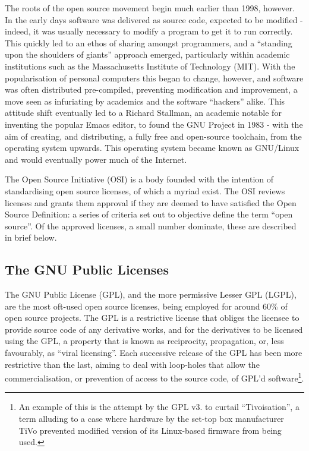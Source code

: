 \documentclass[a4paper]{article}
\begin{document}
The roots of the open source movement begin much earlier than 1998, however. In the early days software was delivered as source code, expected to be modified - indeed, it was usually necessary to modify a program to get it to run correctly\cite{historyos}. This quickly led to an ethos of sharing amongst programmers, and a “standing upon the shoulders of giants” approach emerged, particularly within academic institutions such as the Massachusetts Institute of Technology (MIT)\cite{faif}. With the popularisation of personal computers this began to change, however, and software was often distributed pre-compiled, preventing modification and improvement, a move seen as infuriating by academics and the software “hackers” alike. This attitude shift eventually led to a Richard Stallman, an academic notable for inventing the popular Emacs editor, to found the GNU Project in 1983 - with the aim of creating, and distributing, a fully free and open-source toolchain, from the operating system upwards\cite{stallmanusenet}. This operating system became known as GNU/Linux and would eventually power much of the Internet.

The Open Source Initiative\cite{osi} (OSI) is a body founded with the intention of standardising open source licenses, of which a myriad exist. The OSI reviews licenses and grants them approval if they are deemed to have satisfied the Open Source Definition: a series of criteria set out to objective define the term “open source”\cite{osireview}. Of the approved licenses, a small number dominate, these are described in brief below.

\subsection{The GNU Public Licenses}

The GNU Public License\cite{gpl} (GPL), and the more permissive Lesser GPL (LGPL), are the most oft-used open source licenses, being employed for around 60\% of open source projects\cite{surveyosl}. The GPL is a restrictive license that obliges the licensee to provide source code of any derivative works, and for the derivatives to be licensed using the GPL, a property that is known as reciprocity, propagation, or, less favourably, as “viral licensing”\cite{viral}. Each successive release of the GPL has been more restrictive than the last\cite{kempcurrentdev}, aiming to deal with loop-holes that allow the commercialisation, or prevention of access to the source code, of GPL’d software\footnote{An example of this is the attempt by the GPL v3. to curtail “Tivoisation”, a term alluding to a case where hardware by the set-top box manufacturer TiVo\cite{tivo} prevented modified version of its Linux-based firmware from being used.}.
\end{document}
